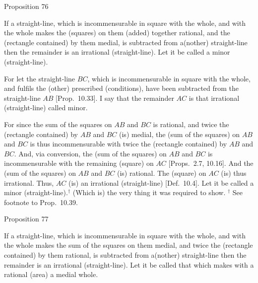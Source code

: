 
\begin{center}
{\large Proposition 76}
\end{center}

If  a straight-line, which is incommensurable in square with the whole,
and  with the whole makes the (squares) on them (added) together rational, and the
(rectangle contained) by them medial, is subtracted from a(nother) straight-line
 then the remainder is an
irrational (straight-line). Let it be called a minor (straight-line).

\epsfysize=0.27in 
\centerline{}

For let the straight-line $BC$, which is incommensurable in square with the whole, and fulfils the (other) prescribed (conditions), have been subtracted from
the straight-line $AB$ [Prop.~10.33]. I say that the remainder $AC$ is that irrational (straight-line)
called minor.

For since the sum of the squares on $AB$ and $BC$ is rational, and twice
the (rectangle contained) by $AB$ and $BC$ (is) medial, the (sum of the squares) on $AB$ and $BC$ is thus incommensurable with twice the
(rectangle contained) by $AB$ and $BC$. And, via conversion, 
the (sum of the squares) on $AB$ and $BC$ is incommensurable with the
remaining (square) on $AC$ [Props.~2.7, 10.16]. And the (sum of the squares) on $AB$
and $BC$ (is) rational. The (square) on $AC$ (is) thus irrational. Thus, 
$AC$ (is) an irrational (straight-line) [Def.~10.4]. Let it be
called a minor (straight-line).$^\dag$ (Which is) the very thing it
was required to show.
{\footnotesize\noindent$^\dag$ See footnote to Prop.~10.39.}


\begin{center}
{\large Proposition 77}
\end{center}

If  a straight-line, which is incommensurable in  square with the whole, and with the
whole makes the sum of the squares on them medial, and twice
the (rectangle contained) by them rational, is subtracted from a(nother) straight-line 
 then the remainder
is an irrational (straight-line). Let it be called that which makes
with a rational (area) a medial whole.

\epsfysize=0.27in 
\centerline{}

